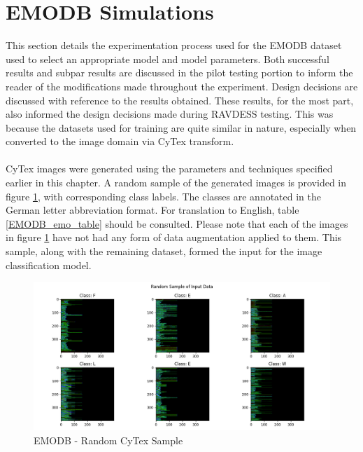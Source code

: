 
\section{EMODB Simulations}
This section details the experimentation process used for the EMODB dataset used to select an appropriate model and model parameters. Both successful results and subpar results are discussed in the pilot testing portion to inform the reader of the modifications made throughout the experiment. Design decisions are discussed with reference to the results obtained. These results, for the most part, also informed the design decisions made during RAVDESS testing. This was because the datasets used for training are quite similar in nature, especially when converted to the image domain via CyTex transform.\\ \\
CyTex images were generated using the parameters and techniques specified earlier in this chapter. A random sample of the generated images is provided in figure \ref{emodb_cytex_imgs}, with corresponding class labels. The classes are annotated in the German letter abbreviation format. For translation to English, table \ref{EMODB_emo_table} should be consulted. Please note that each of the images in figure \ref{emodb_cytex_imgs} have not had any form of data augmentation applied to them. This sample, along with the remaining dataset, formed the input for the image classification model.
\begin{figure}[ht]
        \centering
        \includegraphics[scale = 0.4]{images_results/CyTex_T1-Initial_Pics/Random Input Sample.png}
        \caption{EMODB - Random CyTex Sample}
        \label{emodb_cytex_imgs}
\end{figure}

